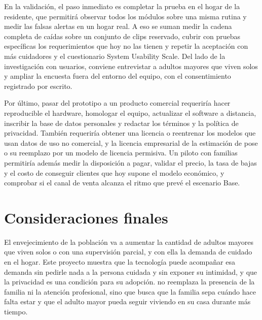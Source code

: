 En la validación, el paso inmediato es completar la prueba en el hogar de la residente, que permitirá observar todos los módulos sobre una misma rutina y medir las falsas alertas en un hogar real.
A eso se suman medir la cadena completa de caídas sobre un conjunto de clips reservado, cubrir con pruebas específicas los requerimientos que hoy no las tienen y repetir la aceptación con más cuidadores y el cuestionario System Usability Scale.
Del lado de la investigación con usuarios, conviene entrevistar a adultos mayores que viven solos y ampliar la encuesta fuera del entorno del equipo, con el consentimiento registrado por escrito.

Por último, pasar del prototipo a un producto comercial requeriría hacer reproducible el hardware, homologar el equipo, actualizar el software a distancia, inscribir la base de datos personales y redactar los términos y la política de privacidad.
También requeriría obtener una licencia o reentrenar los modelos que usan datos de uso no comercial, y la licencia empresarial de la estimación de pose o su reemplazo por un modelo de licencia permisiva.
Un piloto con familias permitiría además medir la disposición a pagar, validar el precio, la tasa de bajas y el costo de conseguir clientes que hoy supone el modelo económico, y comprobar si el canal de venta alcanza el ritmo que prevé el escenario Base.

\section{Consideraciones finales}

El envejecimiento de la población va a aumentar la cantidad de adultos mayores que viven solos o con una supervisión parcial, y con ella la demanda de cuidado en el hogar.
Este proyecto muestra que la tecnología puede acompañar esa demanda sin pedirle nada a la persona cuidada y sin exponer su intimidad, y que la privacidad es una condición para su adopción.
\marca{} no reemplaza la presencia de la familia ni la atención profesional, sino que busca que la familia sepa cuándo hace falta estar y que el adulto mayor pueda seguir viviendo en su casa durante más tiempo.
